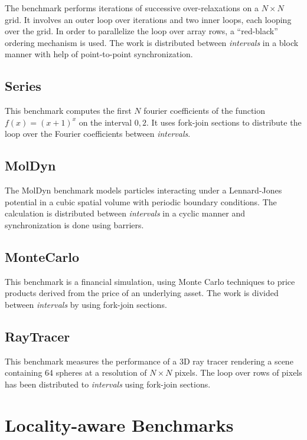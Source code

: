 The benchmark performs iterations of successive over-relaxations on a
$N \times N$ grid. It involves an outer loop over iterations and two
inner loops, each looping over the grid. In order to parallelize the
loop over array rows, a ``red-black'' ordering mechanism is used. The
work is distributed between \emph{intervals} in a block manner with
help of point-to-point synchronization.

\subsection*{Series}

This benchmark computes the first $N$ fourier coefficients of the
function $f(x) = (x+1)^x$ on the interval $0,2$. It uses fork-join
sections to distribute the loop over the Fourier coefficients between
\emph{intervals}.

\subsection*{MolDyn}

The MolDyn benchmark models particles interacting under a
Lennard-Jones potential in a cubic spatial volume with periodic
boundary conditions. The calculation is distributed between
\emph{intervals} in a cyclic manner and synchronization is done using
barriers.

\subsection*{MonteCarlo}

This benchmark is a financial simulation, using Monte Carlo techniques
to price products derived from the price of an underlying asset. The
work is divided between \emph{intervals} by using fork-join sections.

\subsection*{RayTracer}

This benchmark measures the performance of a 3D ray tracer rendering a
scene containing 64 spheres at a resolution of $N \times N$
pixels. The loop over rows of pixels has been distributed to
\emph{intervals} using fork-join sections.


\section{Locality-aware Benchmarks}

